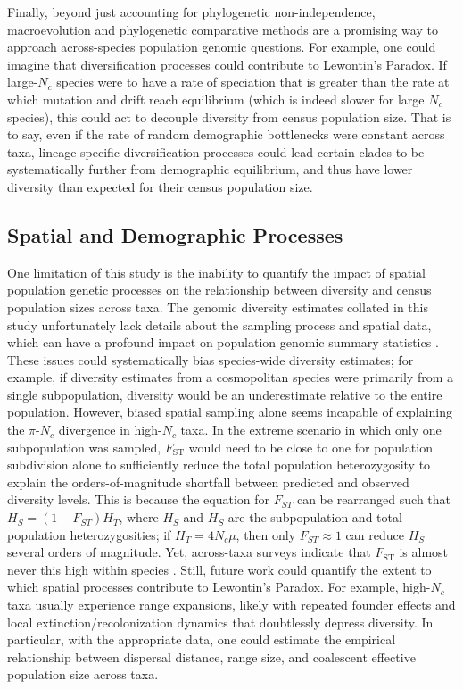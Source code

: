\documentclass[11pt]{article}
\begin{document}
Finally, beyond just accounting for phylogenetic non-independence,
macroevolution and phylogenetic comparative methods are a promising way to
approach across-species population genomic questions. For example, one could
imagine that diversification processes could contribute to Lewontin's Paradox.
If large-$N_c$ species were to have a rate of speciation that is greater than
the rate at which mutation and drift reach equilibrium (which is indeed slower
for large $N_c$ species), this could act to decouple diversity from census
population size. That is to say, even if the rate of random demographic
bottlenecks were constant across taxa, lineage-specific diversification
processes could lead certain clades to be systematically further from
demographic equilibrium, and thus have lower diversity than expected for their
census population size. 

\subsection*{Spatial and Demographic Processes}

One limitation of this study is the inability to quantify the impact of spatial
population genetic processes on the relationship between diversity and census
population sizes across taxa. The genomic diversity estimates collated in this
study unfortunately lack details about the sampling process and spatial data,
which can have a profound impact on population genomic summary statistics
\parencite{Battey2020-lc}. These issues could systematically bias species-wide
diversity estimates; for example, if diversity estimates from a cosmopolitan
species were primarily from a single subpopulation, diversity would be an
underestimate relative to the entire population. However, biased spatial
sampling alone seems incapable of explaining the $\pi$-$N_c$ divergence in
high-$N_c$ taxa. In the extreme scenario in which only one subpopulation was
sampled, $F_\text{ST}$ would need to be close to one for population subdivision
alone to sufficiently reduce the total population heterozygosity to explain the
orders-of-magnitude shortfall between predicted and observed diversity levels.
This is because the equation for $F_{ST}$ can be rearranged such that $H_S =
(1-F_{ST})H_T$, where $H_S$ and $H_S$ are the subpopulation and total
population heterozygosities; if $H_T = 4N_c\mu$, then only $F_{ST} \approx 1$
can reduce $H_S$ several orders of magnitude. Yet, across-taxa surveys indicate
that $F_\text{ST}$ is almost never this high within species
\parencite{Roux2016-lm}.  Still, future work could quantify the extent to which
spatial processes contribute to Lewontin's Paradox. For example, high-$N_c$
taxa usually experience range expansions, likely with repeated founder effects
and local extinction/recolonization dynamics that doubtlessly depress
diversity. In particular, with the appropriate data, one could estimate the
empirical relationship between dispersal distance, range size, and coalescent
effective population size across taxa.
\end{document}
